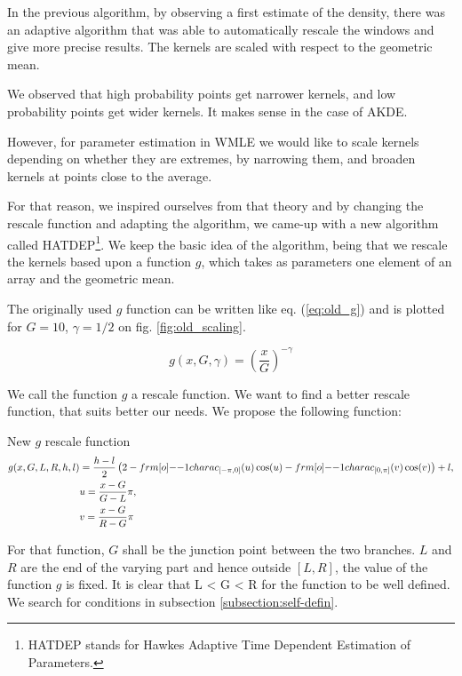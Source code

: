 In the previous algorithm, by observing a first estimate of the density, there was an adaptive algorithm that was able to automatically rescale the windows and give more precise results. The kernels are scaled with respect to the geometric mean. 

We observed that high probability points get narrower kernels, and low probability points get wider kernels. It makes sense in the case of AKDE. 

However, for parameter estimation in WMLE we would like to scale kernels depending on whether they are extremes, by narrowing them, and broaden kernels at points close to the average.

For that reason, we inspired ourselves from that theory and by changing the rescale function and adapting the algorithm, we came-up with a new algorithm called HATDEP\footnote{HATDEP stands for Hawkes Adaptive Time Dependent Estimation of Parameters.}. We keep the basic idea of the algorithm, being that we rescale the kernels based upon a function $g$, which takes as parameters one element of an array and the geometric mean. 

The originally used $g$ function can be written like eq. (\ref{eq:old_g}) and is plotted for $G = 10$, $\gamma = 1/2$ on fig. \ref{fig:old_scaling}. 

\begin{equation}
\label{eq:old_g}
g(x,G, \gamma) =  \left ( \frac x G \right ) ^{-\gamma}
\end{equation}

We call the function $g$ a rescale function. We want to find a better rescale function, that suits better our needs. We propose the following function:


\begin{theoreme}[label = thrm:new_g]{New $g$ rescale function}
\begin{align}
\label{eq:new_g}
g(x, G, L,R,h,l) &=   \frac {h-l} 2 \left (2 
-  \11charac_{ [- \pi, 0]} (u)  \cos(u)
-  \11charac_{ [0, \pi]} (v)  \cos(v) \right ) + l,  \\
\quad & u = \frac{x - G}{G- L} \pi, \notag  \\
\quad & v = \frac{x - G}{R- G} \pi \notag
\end{align}

For that function, $G$ shall be the junction point between the two branches. $L$ and $R$ are the end of the varying part and hence outside $[L,R]$, the value of the function $g$ is fixed. It is clear that L < G < R for the function to be well defined. We search for conditions in subsection \ref{subsection:self-defin}.
\end{theoreme}

